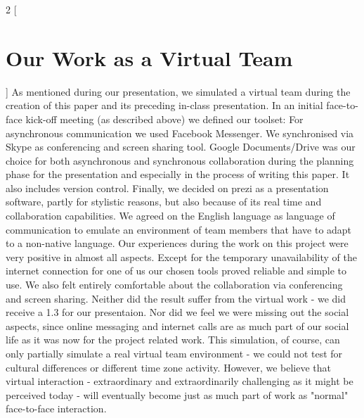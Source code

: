 \begin{multicols}{2}
[\section{Our Work as a Virtual Team}]
As mentioned during our presentation, we simulated a virtual team during the creation of this paper and its preceding in-class presentation. In an initial face-to-face kick-off meeting (as described above) we defined our toolset: For asynchronous communication we used Facebook Messenger. We synchronised via Skype as conferencing and screen sharing tool. Google Documents/Drive was our choice for both asynchronous and synchronous collaboration during the planning phase for the presentation and especially in the process of writing this paper. It also includes version control. Finally, we decided on prezi as a presentation software, partly for stylistic reasons, but also because of its real time and collaboration capabilities. We agreed on the English language as language of communication to emulate an environment of team members that have to adapt to a non-native language.
Our experiences during the work on this project were very positive in almost all aspects. Except for the temporary unavailability of the internet connection for one of us our chosen tools proved reliable and simple to use. We also felt entirely comfortable about the collaboration via conferencing and screen sharing. Neither did the result suffer from the virtual work - we did receive a 1.3 for our presentaion. Nor did we feel we were missing out the social aspects, since online messaging and internet calls are as much part of our social life as it was now for the project related work.
This simulation, of course, can only partially simulate a real virtual team environment - we could not test for cultural differences or different time zone activity. However, we believe that virtual interaction - extraordinary and extraordinarily challenging as it might be perceived today - will eventually become just as much part of work as "normal" face-to-face interaction.
\end{multicols}